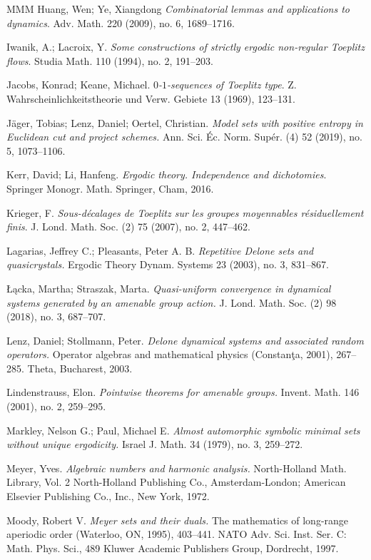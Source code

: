 \documentclass[titlepage,reqno,10pt]{amsart}
\theoremstyle{definition}
\begin{document}
\begin{thebibliography}{MMM}
 Huang, Wen; Ye, Xiangdong  \textit{Combinatorial lemmas and applications to dynamics}. Adv.
Math. 220 (2009), no. 6, 1689–1716.

Iwanik, A.; Lacroix, Y.
{\it Some constructions of strictly ergodic non-regular Toeplitz flows}.
Studia Math. 110 (1994), no. 2, 191--203.

 Jacobs, Konrad; Keane, Michael.
{\it $0$-$1$-sequences of Toeplitz type}.
Z. Wahrscheinlichkeitstheorie und Verw. Gebiete 13 (1969), 123--131.

 J{\"a}ger, Tobias; Lenz, Daniel; Oertel, Christian. {\it Model sets with positive entropy in Euclidean cut and project schemes.} Ann. Sci. Éc. Norm. Supér. (4) 52 (2019), no. 5, 1073--1106.

 Kerr, David; Li, Hanfeng.
{\it Ergodic theory. Independence and dichotomies}.
Springer Monogr. Math.
Springer, Cham, 2016.

 Krieger, F.
{\it Sous-d\'ecalages de Toeplitz sur les groupes moyennables r\'esiduellement finis}.
J. Lond. Math. Soc. (2) 75 (2007), no. 2, 447--462. 

Lagarias, Jeffrey C.; Pleasants, Peter A. B. {\it Repetitive Delone sets and quasicrystals.}
Ergodic Theory Dynam. Systems 23 (2003), no. 3, 831--867.

 Łącka, Martha; Straszak, Marta. \textit{Quasi-uniform convergence in dynamical systems generated by an amenable group action.} J. Lond. Math. Soc. (2) 98 (2018), no. 3, 687--707.

Lenz, Daniel; Stollmann, Peter.
{\it Delone dynamical systems and associated random operators.}  Operator algebras and mathematical physics (Constanţa, 2001), 267--285. Theta, Bucharest, 2003.

Lindenstrauss, Elon. 
{\it Pointwise theorems for amenable groups.} 
Invent. Math. 146 (2001), no. 2, 259--295.

Markley, Nelson G.; Paul, Michael E.
{\it Almost automorphic symbolic minimal sets without unique ergodicity.}
Israel J. Math. 34 (1979), no. 3, 259--272.

 Meyer, Yves. {\it Algebraic numbers and harmonic analysis.} North-Holland Math. Library, Vol. 2 North-Holland Publishing Co., Amsterdam-London; American Elsevier Publishing Co., Inc., New York, 1972.  

 Moody, Robert V. 
{\it Meyer sets and their duals.} The mathematics of long-range aperiodic order (Waterloo, ON, 1995), 403--441. NATO Adv. Sci. Inst. Ser. C: Math. Phys. Sci., 489 Kluwer Academic Publishers Group, Dordrecht, 1997.


\end{thebibliography}
\end{document}
